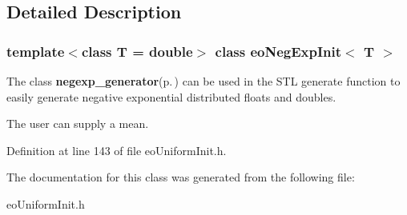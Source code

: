 \subsection{Detailed Description}
\subsubsection*{template$<$class T = double$>$ class eo\-Neg\-Exp\-Init$<$ T $>$}

The class {\bf negexp\_\-generator}{\rm (p.\,\pageref{classnegexp__generator})} can be used in the STL generate function to easily generate negative exponential distributed floats and doubles. 

The user can supply a mean. 



Definition at line 143 of file eo\-Uniform\-Init.h.

The documentation for this class was generated from the following file:\begin{CompactItemize}
\item 
eo\-Uniform\-Init.h\end{CompactItemize}
